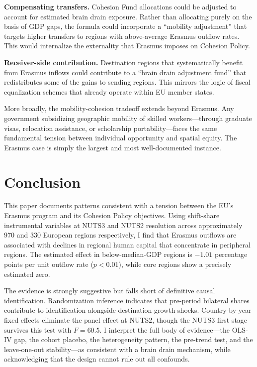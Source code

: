 \documentclass[12pt]{article}
\begin{document}
\textbf{Compensating transfers.} Cohesion Fund allocations could be adjusted to account for estimated brain drain exposure. Rather than allocating purely on the basis of GDP gaps, the formula could incorporate a ``mobility adjustment'' that targets higher transfers to regions with above-average Erasmus outflow rates. This would internalize the externality that Erasmus imposes on Cohesion Policy.

\textbf{Receiver-side contribution.} Destination regions that systematically benefit from Erasmus inflows could contribute to a ``brain drain adjustment fund'' that redistributes some of the gains to sending regions. This mirrors the logic of fiscal equalization schemes that already operate within EU member states.

More broadly, the mobility-cohesion tradeoff extends beyond Erasmus. Any government subsidizing geographic mobility of skilled workers---through graduate visas, relocation assistance, or scholarship portability---faces the same fundamental tension between individual opportunity and spatial equity. The Erasmus case is simply the largest and most well-documented instance.


\section{Conclusion}
\label{sec:conclusion}

This paper documents patterns consistent with a tension between the EU's Erasmus program and its Cohesion Policy objectives. Using shift-share instrumental variables at NUTS3 and NUTS2 resolution across approximately 970 and 330 European regions respectively, I find that Erasmus outflows are associated with declines in regional human capital that concentrate in peripheral regions. The estimated effect in below-median-GDP regions is $-1.01$ percentage points per unit outflow rate ($p < 0.01$), while core regions show a precisely estimated zero.

The evidence is strongly suggestive but falls short of definitive causal identification. Randomization inference indicates that pre-period bilateral shares contribute to identification alongside destination growth shocks. Country-by-year fixed effects eliminate the panel effect at NUTS2, though the NUTS3 first stage survives this test with $F = 60.5$. I interpret the full body of evidence---the OLS-IV gap, the cohort placebo, the heterogeneity pattern, the pre-trend test, and the leave-one-out stability---as consistent with a brain drain mechanism, while acknowledging that the design cannot rule out all confounds.
\end{document}
